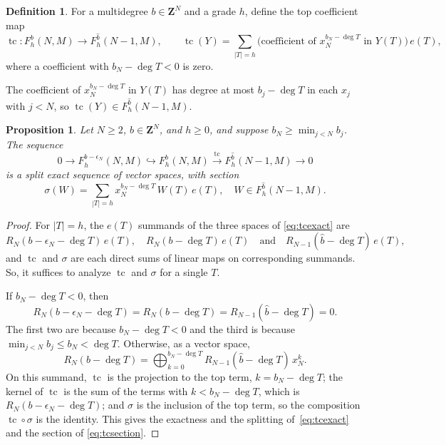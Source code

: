 \documentclass[12pt]{amsart}
\newtheorem{proposition}[theorem]{Proposition}
\theoremstyle{definition}
\newtheorem{definition1}[theorem]{Definition}
\theoremstyle{remark}
\newcommand{\tc}{\operatorname{tc}}
\def\what{\hat}
\newcommand{\Z}{\mathbf Z}
\begin{document}
\begin{definition1}\label{def:tc}
For a multidegree $b\in\Z^N$ and a grade $h$, define the top coefficient map
\[ \tc:F^b_h(N, M) \rightarrow F^{\what b}_h(N-1, M), \qquad
   \tc(Y)=\sum_{|T|=h}\bigl(\text{coefficient of }x_N^{b_N-\deg T}\text{ in }Y(T)\bigr)\,e(T), \]
where a coefficient with $b_N-\deg T<0$ is zero.
\end{definition1}
The coefficient of $x_N^{b_N-\deg T}$ in $Y(T)$ has degree at most
$b_j-\deg T$ in each $x_j$ with $j<N$, so $\tc(Y)\in F^{\what b}_h(N-1, M)$.
\begin{proposition}\label{prop:tcexact}
Let $N\ge2$, $b\in\Z^N$, and $h\ge0$, and suppose $b_N\ge\min_{j<N}b_j$.
The sequence
\begin{equation}\label{eq:tcexact}
0 \to F^{b-\epsilon_N}_h(N, M) \hookrightarrow
 F^b_h(N, M) \xrightarrow{\ \tc\ }   F^{\what b}_h(N-1, M) \to 0
\end{equation}
is a split exact sequence of vector spaces, with section
\begin{equation}\label{eq:tcsection}
\sigma(W)=\sum_{|T|=h}x_N^{b_N-\deg T}\,W(T)\,e(T), 
\quad W \in F^{\what b}_h(N-1, M).
\end{equation}
\end{proposition}
\begin{proof}
For $|T|=h$, the $e(T)$ summands of the three spaces of \eqref{eq:tcexact}
are
\[
R_N(b-\epsilon_N-\deg T)\,e(T),\quad R_N(b-\deg T)\,e(T)\quad\text{and}\quad
R_{N-1}({\what b}-\deg T)\,e(T),
\]
and $\tc$ and $\sigma$ are each
direct sums of linear maps on corresponding summands.  So, it suffices to
analyze $\tc$ and $\sigma$ for a single $T$.

If $b_N-\deg T<0$, then
\[
R_N(b-\epsilon_N-\deg T) = R_N(b-\deg T) = R_{N-1}({\what b}-\deg T) = 0.
\]
The first two are because $b_N - \deg T < 0$ 
and the third is because  $\min_{j<N}b_j \leq b_N < \deg T$. 
Otherwise, as a vector space,
\begin{equation}\label{eq:singlesplit}
R_N(b - \deg T) = \bigoplus_{k = 0}^{b_N - \deg T} R_{N-1}({\what b} - \deg T)\, x_N^k.
\end{equation}
On this summand, $\tc$ is the projection to the top term, $k=b_N-\deg T$;
the kernel of $\tc$ is the sum of the terms with $k<b_N-\deg T$, which is
$R_N(b-\epsilon_N-\deg T)$; and $\sigma$ is the inclusion of the top term,
so the composition ${\tc}\circ\sigma$ is the identity.  This gives the exactness and the
splitting of~\eqref{eq:tcexact} and the section of \eqref{eq:tcsection}.
\end{proof}
\end{document}
